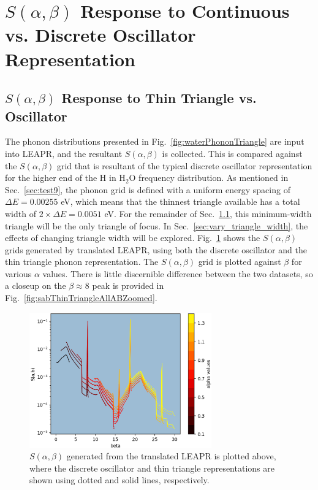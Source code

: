 \documentclass[Master.tex]{subfiles}
\begin{document}
\section{$S(\alpha,\beta)$ Response to Continuous vs. Discrete Oscillator Representation} 

  \subsection{$S(\alpha,\beta)$ Response to Thin Triangle vs. Oscillator}\label{sec:thin_triangle_vs_delta}
    The phonon distributions presented in Fig.~\ref{fig:waterPhononTriangle} are input into LEAPR, and the resultant $S(\alpha,\beta)$ is collected. This is compared against the $S(\alpha,\beta)$ grid that is resultant of the typical discrete oscillator representation for the higher end of the H in H$_2$O frequency distribution. As mentioned in Sec.~\ref{sec:test9}, the phonon grid is defined with a uniform energy spacing of $\Delta E=0.00255$  eV, which means that the thinnest triangle available has a total width of $2\times\Delta E=0.0051$ eV. For the remainder of Sec.~\ref{sec:thin_triangle_vs_delta}, this minimum-width triangle will be the only triangle of focus. In Sec.~\ref{sec:vary_triangle_width}, the effects of changing triangle width will be explored.
    Fig.~\ref{fig:sabThinTriangleAllAB} shows the $S(\alpha,\beta)$ grids generated by translated LEAPR, using both the discrete oscillator and the thin triangle phonon representation. The $S(\alpha,\beta)$ grid is plotted against $\beta$ for various $\alpha$ values. There is little discernible difference between the two datasets, so a closeup on the $\beta\approx8$ peak is provided in Fig.~\ref{fig:sabThinTriangleAllABZoomed}.

    \begin{figure}[h]
      \begin{center}
        \includegraphics[width=0.7\textwidth]{sab_thinTriangle_and_delta_all_ABb}
        \caption[$S(\alpha,\beta)$ grid, comparing oscillator vs. thin triangle representation (translated LEAPR used)]{$S(\alpha,\beta)$ generated from the translated LEAPR is plotted above, where the discrete oscillator and thin triangle representations are shown using dotted and solid lines, respectively.}
        \label{fig:sabThinTriangleAllAB}
      \end{center}
    \end{figure}
\end{document}
